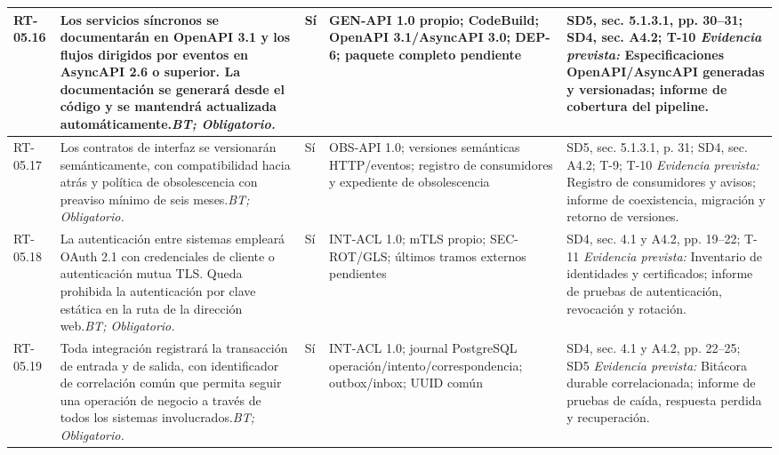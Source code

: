 \begin{paginaHorizontalSynaptix}
\begin{longtable}{|L{0.09\AnchoMatrizTDoce}|L{0.385\AnchoMatrizTDoce}|L{0.065\AnchoMatrizTDoce}|L{0.18\AnchoMatrizTDoce}|L{0.28\AnchoMatrizTDoce}|}
RT-\allowbreak{}05.\allowbreak{}16 &
Los servicios síncronos se documentarán en OpenAPI 3.1 y los flujos dirigidos por eventos en AsyncAPI 2.6 o superior. La documentación se generará desde el código y se mantendrá actualizada automáticamente.\newline\textit{BT; Obligatorio.} &
Sí &
GEN-API 1.0 propio; CodeBuild; OpenAPI 3.1/AsyncAPI 3.0; DEP-6; paquete completo pendiente &
SD5, sec. 5.1.3.1, pp. 30--31; SD4, sec. A4.2; T-10 \newline\textit{Evidencia prevista:} Especificaciones OpenAPI/AsyncAPI generadas y versionadas; informe de cobertura del pipeline. \\ \hline

RT-\allowbreak{}05.\allowbreak{}17 &
Los contratos de interfaz se versionarán semánticamente, con compatibilidad hacia atrás y política de obsolescencia con preaviso mínimo de seis meses.\newline\textit{BT; Obligatorio.} &
Sí &
OBS-API 1.0; versiones semánticas HTTP/eventos; registro de consumidores y expediente de obsolescencia &
SD5, sec. 5.1.3.1, p. 31; SD4, sec. A4.2; T-9; T-10 \newline\textit{Evidencia prevista:} Registro de consumidores y avisos; informe de coexistencia, migración y retorno de versiones. \\ \hline

RT-\allowbreak{}05.\allowbreak{}18 &
La autenticación entre sistemas empleará OAuth 2.1 con credenciales de cliente o autenticación mutua TLS. Queda prohibida la autenticación por clave estática en la ruta de la dirección web.\newline\textit{BT; Obligatorio.} &
Sí &
INT-ACL 1.0; mTLS propio; SEC-ROT/\allowbreak{}GLS; últimos tramos externos pendientes &
SD4, sec. 4.1 y A4.2, pp. 19--22; T-11 \newline\textit{Evidencia prevista:} Inventario de identidades y certificados; informe de pruebas de autenticación, revocación y rotación. \\ \hline

RT-\allowbreak{}05.\allowbreak{}19 &
Toda integración registrará la transacción de entrada y de salida, con identificador de correlación común que permita seguir una operación de negocio a través de todos los sistemas involucrados.\newline\textit{BT; Obligatorio.} &
Sí &
INT-ACL 1.0; journal PostgreSQL operación/\allowbreak{}intento/\allowbreak{}correspondencia; outbox/\allowbreak{}inbox; UUID común &
SD4, sec. 4.1 y A4.2, pp. 22--25; SD5 \newline\textit{Evidencia prevista:} Bitácora durable correlacionada; informe de pruebas de caída, respuesta perdida y recuperación. \\ \hline


\end{longtable}
\end{paginaHorizontalSynaptix}
